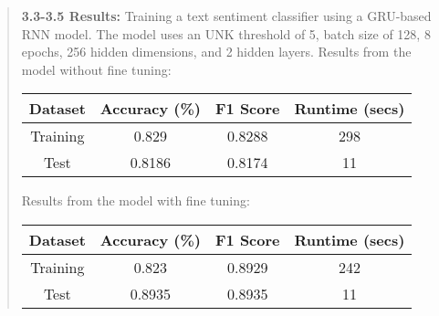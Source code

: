 \begin{quote}
    {\bf 3.3-3.5 Results:} Training a text sentiment classifier using a GRU-based RNN model. 
    The model uses an UNK threshold of 5, batch size of 128, 8 epochs, 256 hidden dimensions, and 2 hidden layers. 
    Results from the model without fine tuning:
    \begin{center}
	\begin{tabular}{ c | c | c | c }
	    Dataset & Accuracy (\%) & F1 Score & Runtime (secs) \\
	    \hline
	    Training & 0.829 & 0.8288 & 298 \\
	    Test & 0.8186 & 0.8174 & 11
	\end{tabular}
    \end{center}

    Results from the model with fine tuning:
    \begin{center}
	\begin{tabular}{ c | c | c | c }
	    Dataset & Accuracy (\%) & F1 Score & Runtime (secs) \\
	    \hline
	    Training & 0.823 & 0.8929 & 242 \\
	    Test & 0.8935 & 0.8935 & 11
	\end{tabular}
    \end{center}

\end{quote}
